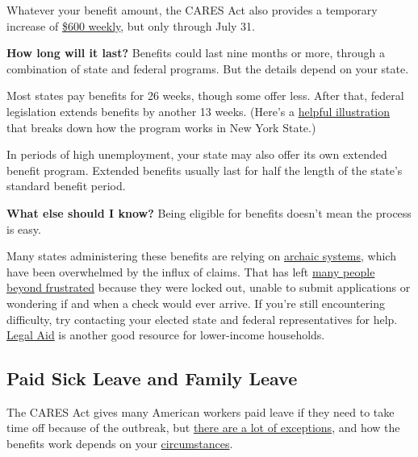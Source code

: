 Whatever your benefit amount, the CARES Act also provides a temporary
increase of
\href{https://www.nytimes.com/interactive/2020/04/23/business/economy/unemployment-benefits-stimulus-coronavirus.html}{\$600
weekly}, but only through July 31.

\textbf{How long will it last?} Benefits could last nine months or more,
through a combination of state and federal programs. But the details
depend on your state.

Most states pay benefits for 26 weeks, though some offer less. After
that, federal legislation extends benefits by another 13 weeks. (Here's
a \href{https://labor.ny.gov/ui/cares-act.shtm}{helpful illustration}
that breaks down how the program works in New York State.)

In periods of high unemployment, your state may also offer its own
extended benefit program. Extended benefits usually last for half the
length of the state's standard benefit period.

\textbf{What else should I know?} Being eligible for benefits doesn't
mean the process is easy.

Many states administering these benefits are relying on
\href{https://www.nytimes.com/2020/04/17/nyregion/coronavirus-pandemic-unemployment-assistance-ny-delays.html}{archaic
systems}, which have been overwhelmed by the influx of claims. That has
left
\href{https://www.nytimes.com/2020/04/23/us/florida-coronavirus-unemployment.html}{many
people}
\href{https://www.nytimes.com/2020/05/08/nyregion/unemployment-benefits-ny-coronavirus.html}{beyond
frustrated} because they were locked out, unable to submit applications
or wondering if and when a check would ever arrive. If you're still
encountering difficulty, try contacting your elected state and federal
representatives for help.
\href{https://www.americanbar.org/groups/legal_services/flh-home/flh-free-legal-help/}{Legal
Aid} is another good resource for lower-income households.

\hypertarget{paid-sick-leave-and-family-leave}{%
\subsection{Paid Sick Leave and Family
Leave}\label{paid-sick-leave-and-family-leave}}

The CARES Act gives many American workers paid leave if they need to
take time off because of the outbreak, but
\href{https://www.nytimes.com/2020/03/14/opinion/coronavirus-pelosi-sick-leave.html}{there
are a lot of exceptions,} and how the benefits work depends on your
\href{https://www.nytimes.com/2020/05/08/upshot/virus-paid-leave-pandemic.html}{circumstances}.

